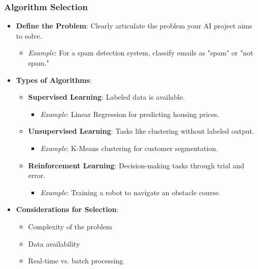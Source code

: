 \documentclass[aspectratio=169]{beamer}
\begin{document}
\begin{frame}
    \frametitle{Algorithm Selection}
    \begin{itemize}
        \item \textbf{Define the Problem}: Clearly articulate the problem your AI project aims to solve.
        \begin{itemize}
            \item \textit{Example}: For a spam detection system, classify emails as "spam" or "not spam."
        \end{itemize}
        
        \item \textbf{Types of Algorithms}:
        \begin{itemize}
            \item \textbf{Supervised Learning}: Labeled data is available.
            \begin{itemize}
                \item \textit{Example}: Linear Regression for predicting housing prices.
            \end{itemize}
            \item \textbf{Unsupervised Learning}: Tasks like clustering without labeled output.
            \begin{itemize}
                \item \textit{Example}: K-Means clustering for customer segmentation.
            \end{itemize}
            \item \textbf{Reinforcement Learning}: Decision-making tasks through trial and error.
            \begin{itemize}
                \item \textit{Example}: Training a robot to navigate an obstacle course.
            \end{itemize}
        \end{itemize}

        \item \textbf{Considerations for Selection}:
        \begin{itemize}
            \item Complexity of the problem
            \item Data availability
            \item Real-time vs. batch processing
        \end{itemize}
    \end{itemize}
\end{frame}
\end{document}

